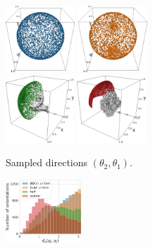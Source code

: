 \begin{figure}[ht!]
    \centering
    \begin{minipage}{.33\linewidth}
        \begin{subfigure}[b]{\linewidth}
            \centering
            \includegraphics[height=2.5cm]{figures/uniform_quaternion.png}%
            \hfill
            \includegraphics[height=2.5cm]{figures/uniform_angles.png}
            \\ \vspace{0.2cm}
            \includegraphics[height=2.5cm]{figures/5j0n-cvg2.pdf}
            \hfill
            \includegraphics[height=2.5cm]{figures/5a1a-cvg2.pdf}
            \caption{Sampled directions $(\theta_2, \theta_1)$.}%
            \label{fig:orientation-sampling:directions}
        \end{subfigure}
    \end{minipage}
    \hfill
    \begin{minipage}{.65\linewidth}
        \begin{subfigure}[b]{0.37\linewidth}
            \centering
            \includegraphics[height=2.4cm]{figures/dQ_distribution_coverage.pdf}

\end{subfigure}
\end{minipage}
\end{figure}
